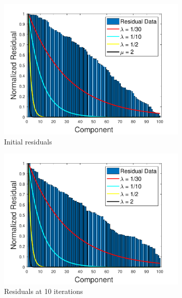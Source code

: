 \documentclass{article}
\theoremstyle{definition}
\theoremstyle{example}
\theoremstyle{example}
\theoremstyle{example}
\begin{document}
\begin{figure}[ht!]	
	\begin{subfigure}{0.33\linewidth}
		\includegraphics[width=\textwidth]{images/exp_dist_overlay_init.pdf}
		\caption{Initial residuals}
		\label{exp_dist_init}
	\end{subfigure}		
	\begin{subfigure}{0.33\linewidth}
		\includegraphics[width=\textwidth]{images/exp_dist_overlay_10iter.pdf}
		\caption{Residuals at 10 iterations}
		\label{exp_dist_10iter}
	\end{subfigure}		
	\begin{subfigure}{0.33\linewidth}

\end{subfigure}
\end{figure}
\end{document}
